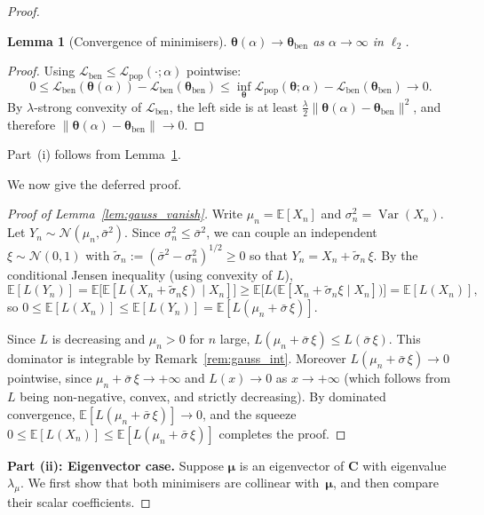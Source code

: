 \documentclass[11pt]{article}
\newcommand{\EE}{\mathbb{E}}
\newcommand{\NN}{\mathcal{N}}
\newcommand{\C}{\mathbf{C}}
\newcommand{\bmu}{\boldsymbol{\mu}}
\newcommand{\btheta}{\boldsymbol{\theta}}
\newtheorem{lemma}[theorem]{Lemma}
\begin{document}
\begin{proof}
\begin{lemma}[Convergence of minimisers]
\label{lem:min_conv}
$\btheta(\alpha) \to \btheta_{\mathrm{ben}}$ as $\alpha \to \infty$ in $\ell_2$.
\end{lemma}
\begin{proof}
Using
$\mathcal{L}_{\mathrm{ben}} \leq
\mathcal{L}_{\mathrm{pop}}(\cdot;\alpha)$ pointwise:
\[
0 \leq \mathcal{L}_{\mathrm{ben}}(\btheta(\alpha))
- \mathcal{L}_{\mathrm{ben}}(\btheta_{\mathrm{ben}})
\leq \inf_{\btheta}\mathcal{L}_{\mathrm{pop}}(\btheta;\alpha)
- \mathcal{L}_{\mathrm{ben}}(\btheta_{\mathrm{ben}}) \to 0.
\]
By $\lambda$-strong convexity of $\mathcal{L}_{\mathrm{ben}}$,
the left side is at least
$\tfrac{\lambda}{2}\|\btheta(\alpha)-\btheta_{\mathrm{ben}}\|^2$,
and therefore
$\|\btheta(\alpha) - \btheta_{\mathrm{ben}}\| \to 0$.
\end{proof}

Part~(i) follows from Lemma~\ref{lem:min_conv}.

We now give the deferred proof.

\begin{proof}[Proof of Lemma~\ref{lem:gauss_vanish}]
Write $\mu_n = \EE[X_n]$ and $\sigma_n^2 = \operatorname{Var}(X_n)$.
Let $Y_n \sim \NN(\mu_n,\bar\sigma^2)$.
Since $\sigma_n^2 \leq \bar\sigma^2$,
we can couple an independent $\xi\sim\NN(0,1)$
with $\tilde\sigma_n
:= (\bar\sigma^2-\sigma_n^2)^{1/2}\geq 0$
so that
$Y_n = X_n + \tilde\sigma_n\,\xi$.
By the conditional Jensen inequality (using convexity of $L$),
\[
\EE[L(Y_n)]
= \EE\bigl[\EE[L(X_n+\tilde\sigma_n\xi)\mid X_n]\bigr]
\geq \EE\bigl[L\bigl(
  \EE[X_n+\tilde\sigma_n\xi\mid X_n]\bigr)\bigr]
= \EE[L(X_n)],
\]
so $0 \leq \EE[L(X_n)]
\leq \EE[L(Y_n)]
= \EE[L(\mu_n+\bar\sigma\,\xi)]$.

Since $L$ is decreasing and $\mu_n > 0$ for $n$ large,
$L(\mu_n+\bar\sigma\,\xi) \leq L(\bar\sigma\,\xi)$.
This dominator is integrable by Remark~\ref{rem:gauss_int}.
Moreover $L(\mu_n+\bar\sigma\,\xi) \to 0$ pointwise,
since $\mu_n+\bar\sigma\,\xi \to +\infty$ and
$L(x)\to 0$ as $x\to+\infty$
(which follows from $L$ being non-negative, convex,
and strictly decreasing).
By dominated convergence,
$\EE[L(\mu_n+\bar\sigma\,\xi)] \to 0$,
and the squeeze
$0 \leq \EE[L(X_n)] \leq \EE[L(\mu_n+\bar\sigma\,\xi)]$
completes the proof.
\end{proof}

\medskip
\noindent\textbf{Part (ii): Eigenvector case.}
Suppose $\bmu$ is an eigenvector of $\C$ with eigenvalue~$\lambda_\mu$.
We first show that both minimisers are collinear with~$\bmu$, and then
compare their scalar coefficients.


\end{proof}
\end{document}
